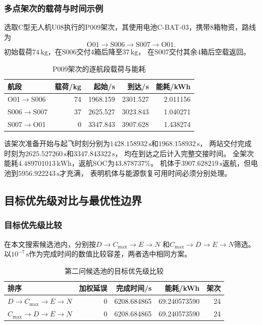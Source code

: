 \subsubsection{多点架次的载荷与时间示例}
选取C型无人机U08执行的P009架次，其使用电池C-BAT-03，携带8箱物资，路线为
\begin{equation}
\mathrm{O01}\rightarrow\mathrm{S006}\rightarrow\mathrm{S007}\rightarrow\mathrm{O01}.
\end{equation}
初始载荷$74\,\mathrm{kg}$，在S006交付4箱后降至$37\,\mathrm{kg}$，
在S007交付其余4箱后空载返回。
\begin{table}[htbp]
\centering
\small
\caption{P009架次的逐航段载荷与能耗}
\label{tab:q2_multistop}
\begin{tabular}{lrrrr}
\toprule
航段 & 载荷/kg & 起始/s & 到达/s & 能耗/kWh \\
\midrule
O01$\rightarrow$S006 & 74 & 1968.159 & 2301.527 & 2.011156 \\
S006$\rightarrow$S007 & 37 & 2625.527 & 3023.843 & 1.040271 \\
S007$\rightarrow$O01 & 0 & 3347.843 & 3907.628 & 1.438274 \\
\bottomrule
\end{tabular}
\end{table}

该架次准备开始与起飞时刻分别为$1428.158932\,\mathrm{s}$和$1968.158932\,\mathrm{s}$，
两站交付完成时刻为$2625.527260\,\mathrm{s}$和$3347.843322\,\mathrm{s}$，
均在到达之后计入完整交接时间。
全架次能耗$4.489701013\,\mathrm{kWh}$，返航SOC为$43.878737\%$。
机体于$3907.628219\,\mathrm{s}$返航，但电池到$5956.922243\,\mathrm{s}$才充满，
表明机体与能源恢复可用时间必须分别处理。

\subsection{目标优先级对比与最优性边界}
\subsubsection{目标优先级比较}
在本文搜索候选池内，分别按$D\rightarrow C_{\max}\rightarrow E\rightarrow N$
和$C_{\max}\rightarrow D\rightarrow E\rightarrow N$筛选。
以$10^{-7}\,\mathrm{s}$作为完成时间的数值比较容差，两者选中相同方案。
\begin{table}[htbp]
\centering
\small
\caption{第二问候选池的目标优先级比较}
\label{tab:q2_priority}
\begin{tabular}{lrrrr}
\toprule
排序 & 加权延误 & 完成时间/s & 能耗/kWh & 架次 \\
\midrule
$D\to C_{\max}\to E\to N$ & 0 & 6208.684865 & 69.240573590 & 24 \\
$C_{\max}\to D\to E\to N$ & 0 & 6208.684865 & 69.240573590 & 24 \\
\bottomrule
\end{tabular}
\end{table}

